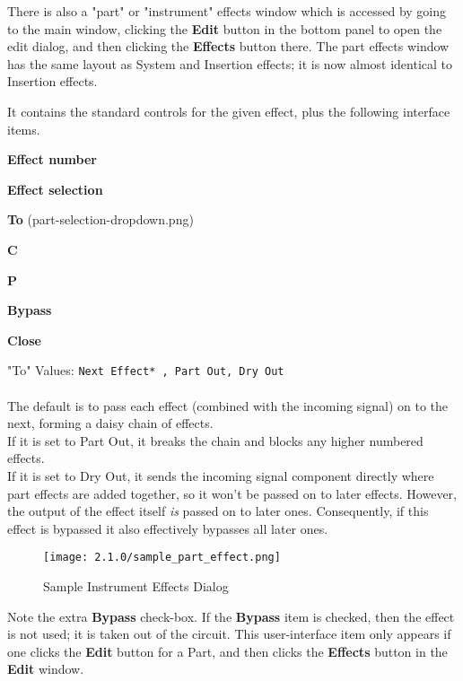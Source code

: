    There is also a "part" or "instrument" effects window which is accessed
   by going to the main window, clicking the \textbf{Edit} button in the
   bottom panel to open the edit dialog, and then clicking the
   \textbf{Effects} button there.  The part effects window has the
   same layout as System and Insertion effects; it is now almost identical
   to Insertion effects.

   It contains the standard controls for the given effect, plus the
   following interface items.

   \begin{enumber}
      \item \textbf{Effect number}
      \item \textbf{Effect selection}
      \item \textbf{To} (part-selection-dropdown.png)
      \item \textbf{C}
      \item \textbf{P}
      \item \textbf{Bypass}
      \item \textbf{Close}
   \end{enumber}

   "To" Values: \texttt{Next Effect* , Part Out, Dry Out}\\
   \\
   The default is to pass each effect (combined with the incoming signal) on to the next,
   forming a daisy chain of effects.\\
   If it is set to Part Out, it breaks the chain and blocks any higher numbered effects.\\
   If it is set to Dry Out, it sends the incoming signal component directly where part
   effects are added together, so it won't be passed on to later effects. However, the
   output of the effect itself \textsl{is} passed on to later ones. Consequently, if this
   effect is bypassed it also effectively bypasses all later ones.

\begin{figure}[H]
   \centering
   \texttt{[image: 2.1.0/sample\_part\_effect.png]}
   \caption{Sample Instrument Effects Dialog}
   \label{fig:sample_instrument_effects_dialog}
\end{figure}

   Note the extra \textbf{Bypass} check-box.  If the \textbf{Bypass} item is
   checked, then the effect is not used; it is taken out of the circuit.  This
   user-interface item only appears if one clicks the \textbf{Edit} button for
   a Part, and then clicks the \textbf{Effects} button in the \textbf{Edit}
   window.

